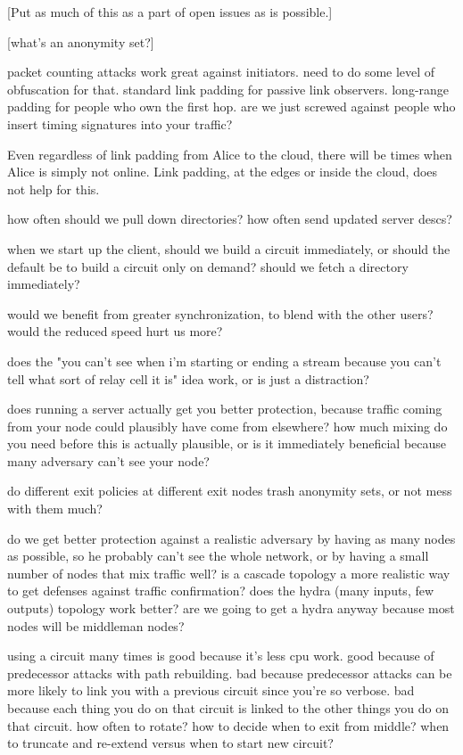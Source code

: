 \documentclass[times,10pt,twocolumn]{article}
\begin{document}
[Put as much of this as a part of open issues as is possible.]

[what's an anonymity set?]

packet counting attacks work great against initiators. need to do some
level of obfuscation for that. standard link padding for passive link
observers. long-range padding for people who own the first hop. are
we just screwed against people who insert timing signatures into your
traffic?

Even regardless of link padding from Alice to the cloud, there will be
times when Alice is simply not online. Link padding, at the edges or
inside the cloud, does not help for this.

how often should we pull down directories? how often send updated
server descs?

when we start up the client, should we build a circuit immediately,
or should the default be to build a circuit only on demand? should we
fetch a directory immediately?

would we benefit from greater synchronization, to blend with the other
users? would the reduced speed hurt us more?

does the "you can't see when i'm starting or ending a stream because
you can't tell what sort of relay cell it is" idea work, or is just
a distraction?

does running a server actually get you better protection, because traffic
coming from your node could plausibly have come from elsewhere? how
much mixing do you need before this is actually plausible, or is it
immediately beneficial because many adversary can't see your node?

do different exit policies at different exit nodes trash anonymity sets,
or not mess with them much?

do we get better protection against a realistic adversary by having as
many nodes as possible, so he probably can't see the whole network,
or by having a small number of nodes that mix traffic well? is a
cascade topology a more realistic way to get defenses against traffic
confirmation? does the hydra (many inputs, few outputs) topology work
better? are we going to get a hydra anyway because most nodes will be
middleman nodes?

using a circuit many times is good because it's less cpu work.
  good because of predecessor attacks with path rebuilding.
  bad because predecessor attacks can be more likely to link you with a
    previous circuit since you're so verbose.
  bad because each thing you do on that circuit is linked to the other
    things you do on that circuit.
  how often to rotate?
  how to decide when to exit from middle?
  when to truncate and re-extend versus when to start new circuit?
\end{document}

